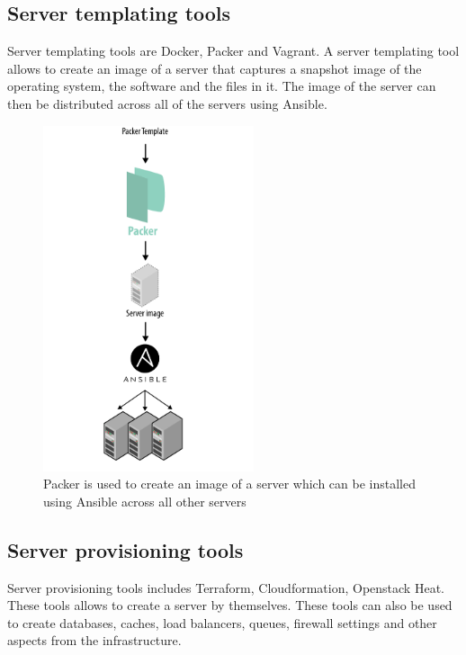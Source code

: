 \documentclass[9pt,twocolumn,twoside]{../../styles/osajnl}
\begin{document}
\subsection{Server templating tools}

Server templating tools are Docker, Packer and Vagrant. A server
templating tool allows to create an image of a server that captures a
snapshot image of the operating system, the software and the files in
it. The image of the server can then be distributed across all of the
servers using Ansible\cite{www-terraform-upandrunning}.


\begin{figure}[h]
  \begin{center}
 \includegraphics[width=\linewidth,height=4in]{images/packer}
 \caption{ Packer is used to create an image of a server which can be installed using Ansible across all other servers \cite{www-terraform-upandrunning}}
 \label{fig}
  \end{center}
\end{figure}

\subsection{Server provisioning tools}
Server provisioning tools includes Terraform, Cloudformation,
Openstack Heat\cite{www-terraform-upandrunning}. These tools allows to
create a server by themselves. These tools can also be used to create
databases, caches, load balancers, queues, firewall settings and
other aspects from the infrastructure\cite{www-terraform-upandrunning}.
\end{document}
